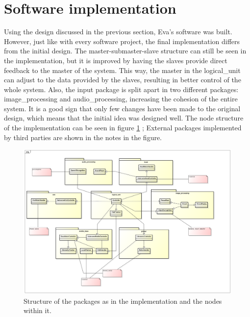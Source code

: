 \documentclass[technical_document.tex]{subfiles}
\begin{document}
\section{Software implementation}
\label{sec:implementation}
Using the design discussed in the previous section, Eva's software was built. However, just like with every software project, the final implementation differs from the initial design. The master-submaster-slave structure can still be seen in the implementation, but it is improved by having the slaves provide direct feedback to the master of the system. This way, the master in the logical\_unit can adjust to the data provided by the slaves, resulting in better control of the whole system. Also, the input package is split apart in two different packages: image\_processing and audio\_processing, increasing the cohesion of the entire system. It is a good sign that only few changes have been made to the original design, which means that the initial idea was designed well. The node structure of the implementation can be seen in figure \ref{fig:implementation} ; External packages implemented by third parties are shown in the notes in the figure.

\begin{figure}[ht!]
	\centering
	\mbox{\includegraphics[scale=0.3]{Images/nodes.png}}
	\caption{Structure of the packages as in the implementation and the nodes within it.}
	\label{fig:implementation}
\end{figure}
\end{document}
